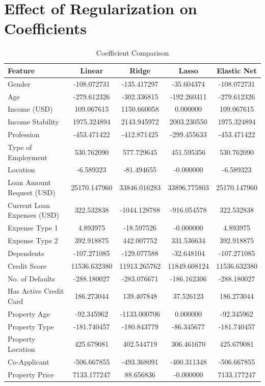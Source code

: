 \documentclass[11pt]{article}
\begin{document}
\section*{Effect of Regularization on Coefficients}
\begin{table}[h!]
\centering
\renewcommand{\arraystretch}{1.3}
\caption{Coefficient Comparison}
\begin{tabular}{|l|c|c|c|c|}
\hline
Feature & Linear & Ridge & Lasso & Elastic Net \\ \hline
Gender & -108.072731 & -135.417297 & -35.604374 & -108.072731 \\
Age & -279.612326 & -302.336815 & -192.260311 & -279.612326 \\
Income (USD) & 109.067615 & 1150.660058 & 0.000000 & 109.067615 \\
Income Stability & 1975.324894 & 2143.945972 & 2003.230550 & 1975.324894 \\
Profession & -453.471422 & -412.871425 & -299.455633 & -453.471422 \\
Type of Employment & 530.762090 & 577.729645 & 451.595356 & 530.762090 \\
Location & -6.589323 & -81.494655 & -0.000000 & -6.589323 \\
Loan Amount Request (USD) & 25170.147960 & 33846.016283 & 33896.775803 & 25170.147960 \\
Current Loan Expenses (USD) & 322.532838 & -1044.128788 & -916.054578 & 322.532838 \\
Expense Type 1 & 4.893975 & -18.597526 & -0.000000 & 4.893975 \\
Expense Type 2 & 392.918875 & 442.007752 & 331.536634 & 392.918875 \\
Dependents & -107.271085 & -129.077588 & -32.648104 & -107.271085 \\
Credit Score & 11536.632380 & 11913.265762 & 11849.608124 & 11536.632380 \\
No. of Defaults & -288.180027 & -283.076671 & -186.162306 & -288.180027 \\
Has Active Credit Card & 186.273044 & 139.407848 & 37.526123 & 186.273044 \\
Property Age & -92.345962 & -1133.000706 & 0.000000 & -92.345962 \\
Property Type & -181.740457 & -180.843779 & -86.345677 & -181.740457 \\
Property Location & 425.679081 & 402.544719 & 306.461670 & 425.679081 \\
Co-Applicant & -506.667855 & -493.368091 & -400.311348 & -506.667855 \\
Property Price & 7133.177247 & 88.656836 & -0.000000 & 7133.177247 \\ \hline
\end{tabular}
\end{table}
\end{document}
